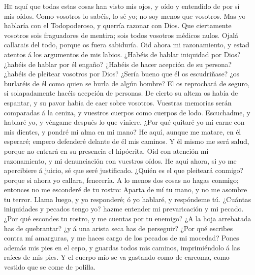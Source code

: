  \textsc{He} aquí que todas estas cosas han visto mis
ojos, y oído y entendido de por sí mis oídos.  Como
vosotros lo sabéis, lo sé yo; no soy menos que vosotros. 
Mas yo hablaría con el Todopoderoso, y querría razonar con Dios.
 Que ciertamente vosotros sois fraguadores de mentira;
sois todos vosotros médicos nulos.  Ojalá callarais del
todo, porque os fuera sabiduría.  Oid ahora mi
razonamiento, y estad atentos á los argumentos de mis labios.
 ¿Habéis de hablar iniquidad por Dios? ¿habéis de hablar
por él engaño?  ¿Habéis de hacer acepción de su persona?
¿habéis de pleitear vosotros por Dios?  ¿Sería bueno que
él os escudriñase? ¿os burlaréis de él como quien se burla de algún
hombre?  El os reprochará de seguro, si solapadamente
hacéis acepción de personas.  De cierto su alteza os
había de espantar, y su pavor había de caer sobre vosotros.
 Vuestras memorias serán comparadas á la ceniza, y
vuestros cuerpos como cuerpos de lodo.  Escuchadme, y
hablaré yo, y véngame después lo que viniere.  ¿Por qué
quitaré yo mi carne con mis dientes, y pondré mi alma en mi mano?
 He aquí, aunque me matare, en él esperaré; empero
defenderé delante de él mis caminos.  Y él mismo me será
salud, porque no entrará en su presencia el hipócrita. 
Oid con atención mi razonamiento, y mi denunciación con vuestros oídos.
 He aquí ahora, si yo me apercibiere á juicio, sé que
seré justificado.  ¿Quién es el que pleiteará conmigo?
porque si ahora yo callara, fenecería.  A lo menos dos
cosas no hagas conmigo; entonces no me esconderé de tu rostro:
 Aparta de mí tu mano, y no me asombre tu terror.
 Llama luego, y yo responderé; ó yo hablaré, y respóndeme
tú.  ¿Cuántas iniquidades y pecados tengo yo? hazme
entender mi prevaricación y mi pecado.  ¿Por qué escondes
tu rostro, y me cuentas por tu enemigo?  ¿A la hoja
arrebatada has de quebrantar? ¿y á una arista seca has de perseguir?
 ¿Por qué escribes contra mí amarguras, y me haces cargo
de los pecados de mi mocedad?  Pones además mis pies en
el cepo, y guardas todos mis caminos, imprimiéndolo á las raíces de mis
pies.  Y el cuerpo mío se va gastando como de carcoma,
como vestido que se come de polilla.

